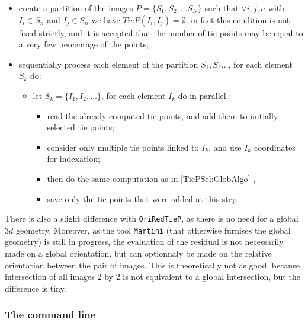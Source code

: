 \begin{itemize}
   \item create a partition of the images $P=\{S_1,S_2,...S_N\}$ such that
         $\forall i,j,n$  with $I_i \in S_n$ and $I_j \in S_n$ we have $ TieP(I_i,I_j) = \emptyset $; 
         in fact this condition is not fixed strictly, and it is accepted that the
          number of tie points may be equal to a very few percentage of the points;
 
   \item sequentially process each element of the partition $S_1, S_2 \dots $, for each element $S_k$  do:

   \begin{itemize}
        \item let  $S_k =\{I_1, I_2 , \dots \} $, for each element $I_k$  do in parallel :
        \begin{itemize}
              \item read the already computed tie points, and add them to initially selected tie points;
              \item consider only multiple tie points linked to $I_k$, and use $I_k$ coordinates for
                    indexation;
              \item then do the same computation as  in  \ref{TiePSel:GlobAlgo} , 
              \item save only the tie points that were added at this step.
        \end{itemize}
   \end{itemize}
\end{itemize}


There is also a slight difference with {\tt OriRedTieP}, as there is no need for a global $3d$ geometry. Moreover, as the tool {\tt Martini} (that otherwise furnises the global geometry) is still in progress, the evaluation of the residual is
not necessarily made on a global orientation, but can optionnaly be made on the relative 
orientation between the pair of images. This is
theoretically not as good, because intersection of all images $2$ by $2$ is not equivalent to a global
intersection, but the difference is tiny. 



\subsubsection{The command line}

